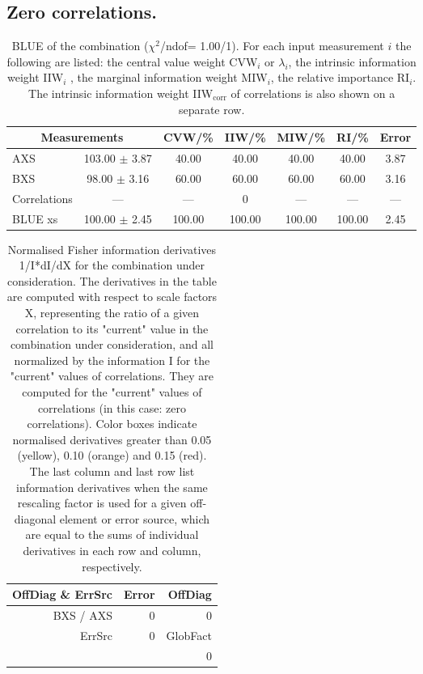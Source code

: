 \subsection{Zero correlations.}
\begin{table}[H]
\scriptsize
\begin{center}
\renewcommand{\arraystretch}{1.1}
\begin{tabular}{|lc|c|c|c|c|c|}
\hline
\multicolumn{2}{|c|}{Measurements} & CVW/\%  & IIW/\%  & MIW/\%  & RI/\%  & {\tiny Error}\\
\hline
AXS &     103.00 $\pm$       3.87 &      40.00 &      40.00 &      40.00 &      40.00 &       3.87\\
BXS &      98.00 $\pm$       3.16 &      60.00 &      60.00 &      60.00 &      60.00 &       3.16\\
Correlations & --- & --- &  0 & --- & --- & ---\\
\hline
BLUE {\tiny xs} &     100.00 $\pm$       2.45 &     100.00 &     100.00 &     100.00 &     100.00 &       2.45\\
\hline
\end{tabular}
\caption{BLUE of the combination ($\chi^2$/ndof=      1.00/1).
 For each input measurement $i$ the following are listed: the central value weight CVW$_i$ or $\lambda_i$, the intrinsic information weight IIW$_i$ , the marginal information weight MIW$_i$, the relative importance RI$_i$. The intrinsic information weight IIW$_{\mathrm{corr}}$ of correlations is also shown on a separate row.}
\renewcommand{\arraystretch}{1}
\end{center}
\end{table}
\begin{table}[H]
\scriptsize
\begin{center}
\renewcommand{\arraystretch}{1.1}
\begin{tabular}{|r|r|r|}
\hline
 OffDiag \& ErrSrc & {\tiny Error} & OffDiag\\
\hline
BXS / AXS &  0 &  0 \\
\hline
\multirow{2}{*}{ErrSrc} & \multirow{2}{*}{ 0} & GlobFact\\
 & &  0 \\
\hline
\end{tabular}
\renewcommand{\arraystretch}{1}
\caption{Normalised Fisher information derivatives 1/I*dI/dX for the combination under consideration. The derivatives in the table are computed with respect to scale factors X, representing the ratio of a given correlation to its "current" value in the combination under consideration, and all normalized by the information I for the "current" values of correlations. They are computed for the "current" values of correlations (in this case: zero correlations). Color boxes indicate normalised derivatives greater than 0.05 (yellow), 0.10 (orange) and 0.15 (red). The last column and last row list information derivatives when the same rescaling factor is used for a given off-diagonal element or error source, which are equal to the sums of individual derivatives in each row and column, respectively.}
\end{center}
\end{table}
